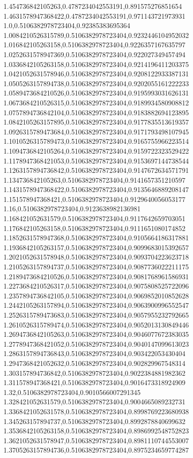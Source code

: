 1.454736842105263,0.4787234042553191,0.891575276851654
1.4631578947368422,0.4787234042553191,0.971143721973931
1.0,0.5106382978723404,0.92385383695364
1.0084210526315789,0.5106382978723404,0.9232446104952032
1.016842105263158,0.5106382978723404,0.9226357167635797
1.0252631578947369,0.5106382978723404,0.922027349457494
1.0336842105263158,0.5106382978723404,0.9214196411203375
1.0421052631578946,0.5106382978723404,0.9208122933387131
1.0505263157894738,0.5106382978723404,0.9202055161222233
1.0589473684210526,0.5106382978723404,0.9195993031626131
1.0673684210526315,0.5106382978723404,0.9189934580908812
1.0757894736842104,0.5106382978723404,0.9183882694123895
1.0842105263157895,0.5106382978723404,0.9177835513619357
1.0926315789473684,0.5106382978723404,0.9171793498107945
1.1010526315789473,0.5106382978723404,0.9165755966223514
1.1094736842105264,0.5106382978723404,0.9159722323529422
1.1178947368421053,0.5106382978723404,0.9153697144738544
1.1263157894736842,0.5106382978723404,0.9147672634571791
1.134736842105263,0.5106382978723404,0.9141657351210597
1.1431578947368422,0.5106382978723404,0.9135646889208147
1.151578947368421,0.5106382978723404,0.9129640056053177
1.16,0.5106382978723404,0.9123638982136981
1.168421052631579,0.5106382978723404,0.9117642659703051
1.176842105263158,0.5106382978723404,0.9111651080174852
1.1852631578947368,0.5106382978723404,0.9105664186317881
1.1936842105263157,0.5106382978723404,0.9099683015392657
1.2021052631578948,0.5106382978723404,0.9093704223623718
1.2105263157894737,0.5106382978723404,0.9087736022211175
1.2189473684210526,0.5106382978723404,0.9081768961586931
1.2273684210526317,0.5106382978723404,0.9075808525722096
1.2357894736842105,0.5106382978723404,0.9069852010852628
1.2442105263157894,0.5106382978723404,0.9063900996552547
1.2526315789473683,0.5106382978723404,0.9057955232792665
1.2610526315789474,0.5106382978723404,0.9052013130849446
1.2694736842105263,0.5106382978723404,0.9046077672383035
1.2778947368421052,0.5106382978723404,0.9040147099613023
1.2863157894736843,0.5106382978723404,0.903422053430404
1.2947368421052632,0.5106382978723404,0.902829967548314
1.303157894736842,0.5106382978723404,0.9022384881982362
1.311578947368421,0.5106382978723404,0.9016473318924909
1.32,0.5106382978723404,0.9010566007291345
1.328421052631579,0.5106382978723404,0.9004665089232731
1.3368421052631578,0.5106382978723404,0.8998769223680938
1.345263157894737,0.5106382978723404,0.8992878840699632
1.3536842105263158,0.5106382978723404,0.8986992548752823
1.3621052631578947,0.5106382978723404,0.8981110744553007
1.3705263157894736,0.5106382978723404,0.8975234659774287
